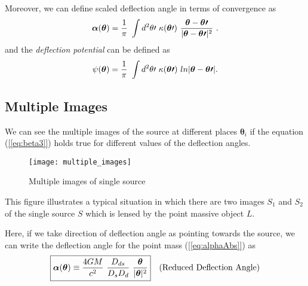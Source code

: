   Moreover, we can define scaled deflection angle in terms of convergence as
  \begin{equation}\label{[eq:alpah_kappa]}
    \boldsymbol{\alpha}(\boldsymbol{\theta} ) = \frac{1}{\pi}\ \int d^2 \theta\prime \ \kappa(\boldsymbol{\theta}\prime) \ \frac{\boldsymbol{\theta} - \boldsymbol{\theta\prime} }{\abs{\boldsymbol{\theta} - \boldsymbol{\theta\prime} }^2}\  .
  \end{equation}
  and the \textit{deflection potential} can be defined as
  \begin{equation}\label{[eq:psi]}
    \psi(\boldsymbol{\theta}) = \frac{1}{\pi}\  \int d^2 \theta\prime \ \kappa(\boldsymbol{\theta\prime} ) \ ln\abs{\boldsymbol{\theta} - \boldsymbol{\theta\prime}}.
  \end{equation}
  

%
%
%
\subsection{Multiple Images}
  We can see the multiple images of the source at different places
  $\boldsymbol{\theta}_i $ if the equation (\ref{[eq:beta3]})
  holds true for different values of the deflection angles.

  \begin{figure}[ht!]
      \centering
      \texttt{[image: multiple\_images]}
      \caption[Multiple images of single source]{Multiple images of single source ~\protect\cite{sch07}}
      \label{[fig:multiple_images]}
  \end{figure}

  This figure illustrates a typical situation in which there are two images $S_1$
  and $S_2$ of the single source $S$ which is lensed by the point massive object
  $L$.

  Here, if we take direction of deflection angle as pointing towards the source,
  we can write the deflection angle for the point mass (\ref{[eq:alphaAbs]}) as
  \begin{equation}\label{[eq:alpha_point_mass]}
    \boxed{\boldsymbol{\alpha} (\boldsymbol{\theta}  ) \equiv \frac{4GM}{c^2}\  \frac{D_{ds}}{D_s D_d}\  \frac{\boldsymbol{\theta} }{\lvert\boldsymbol{\theta}\rvert^2}} \quad (\text{Reduced Deflection Angle})
  \end{equation}

